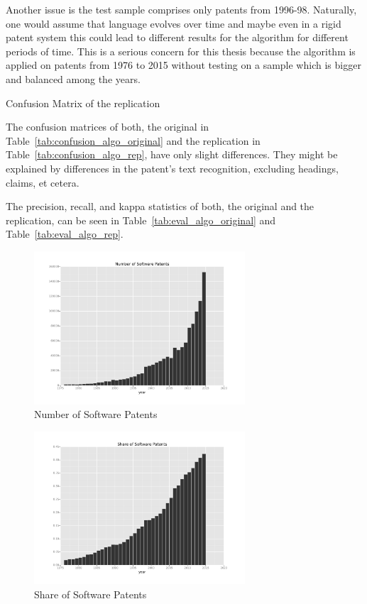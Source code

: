 \documentclass[12pt, a4paper]{scrartcl}
\newcommand{\ra}[1]{\renewcommand{\arraystretch}{#1}}
\theoremstyle{definition}
\begin{document}
Another issue is the test sample comprises only patents from 1996-98.
Naturally, one would assume that language evolves over time and maybe even in a
rigid patent system this could lead to different results for the algorithm for
different periods of time. This is a serious concern for this thesis because
the algorithm is applied on patents from 1976 to 2015 without testing on a
sample which is bigger and balanced among the years.

\begin{table}[tb]\caption{Confusion Matrix of the replication}\label{tab:confusion_algo_rep}\centering\ra{1.3}
    
\end{table}

The confusion matrices of both, the original in
Table~\ref{tab:confusion_algo_original} and the replication in
Table~\ref{tab:confusion_algo_rep}, have only slight differences. They might be
explained by differences in the patent's text recognition, excluding headings,
claims, et cetera.

The precision, recall, and kappa statistics of both, the original and the
replication, can be seen in Table~\ref{tab:eval_algo_original} and
Table~\ref{tab:eval_algo_rep}.

\begin{figure}[tb]
	\centering
	\includegraphics[width=0.7\textwidth]{graphics/Number of Software Patents.png}
	\caption{Number of Software Patents}
	\label{fig:softpat}
\end{figure}

\begin{figure}[tb]
	\centering
	\includegraphics[width=0.7\textwidth]{graphics/Share of Software Patents.png}
	\caption{Share of Software Patents}
	\label{fig:sharesoft}
\end{figure}
\end{document}
